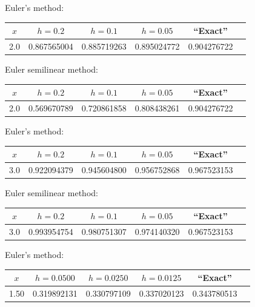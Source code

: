 \bigskip

{\small Euler's method:
\begin{tabular}{|c|r|r|r|r|r|}
\hline
\multicolumn{1}{|c|}{$x$}&
\multicolumn{1}{|c|}{$h=0.2$}&
\multicolumn{1}{|c|}{$h=0.1$}&
\multicolumn{1}{|c|}{$h=0.05$}&
\multicolumn{1}{|c|}{``Exact''}\\ \hline
2.0 & 0.867565004 & 0.885719263 & 0.895024772 & 0.904276722 \\
\hline
\end{tabular}}

\bigskip

\hspace{.75in}
{\small Euler semilinear method:
\begin{tabular}{|c|r|r|r|r|r|}
\hline
\multicolumn{1}{|c|}{$x$}&
\multicolumn{1}{|c|}{$h=0.2$}&
\multicolumn{1}{|c|}{$h=0.1$}&
\multicolumn{1}{|c|}{$h=0.05$}&
\multicolumn{1}{|c|}{``Exact''}\\ \hline
2.0 & 0.569670789 & 0.720861858 & 0.808438261 & 0.904276722 \\
\hline
\end{tabular}}

\bigskip
{}
{\small Euler's method:
\begin{tabular}{|c|r|r|r|r|r|}
\hline
\multicolumn{1}{|c|}{$x$}&
\multicolumn{1}{|c|}{$h=0.2$}&
\multicolumn{1}{|c|}{$h=0.1$}&
\multicolumn{1}{|c|}{$h=0.05$}&
\multicolumn{1}{|c|}{``Exact''}\\ \hline
3.0 & 0.922094379 & 0.945604800 & 0.956752868 & 0.967523153 \\
\hline
\end{tabular}}

\bigskip

\hspace{.75in}
{\small Euler semilinear method:
\begin{tabular}{|c|r|r|r|r|r|}
\hline
\multicolumn{1}{|c|}{$x$}&
\multicolumn{1}{|c|}{$h=0.2$}&
\multicolumn{1}{|c|}{$h=0.1$}&
\multicolumn{1}{|c|}{$h=0.05$}&
\multicolumn{1}{|c|}{``Exact''}\\ \hline
3.0 & 0.993954754 & 0.980751307 & 0.974140320 & 0.967523153 \\
\hline
\end{tabular}}

\bigskip

{\small Euler's method:
\begin{tabular}{|c|r|r|r|r|r|}
\hline
\multicolumn{1}{|c|}{$x$}&
\multicolumn{1}{|c|}{$h=0.0500$}&
\multicolumn{1}{|c|}{$h=0.0250$}&
\multicolumn{1}{|c|}{$h=0.0125$}&
\multicolumn{1}{|c|}{``Exact''}\\ \hline
1.50 & 0.319892131 & 0.330797109 & 0.337020123 & 0.343780513 \\
\hline
\end{tabular}}
\bigskip

